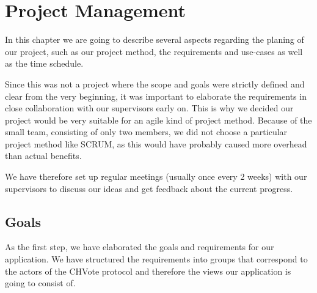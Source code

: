 
\newcommand{\zs}[0]{\cellcolor{zscol}}				%
\newcommand{\zi}[0]{\cellcolor{zicol}}				%
\newcommand{\ms}[1]{
	\makebox[.7cm][r]{
		\tikz[baseline=(char.base)]{
			\node[shape=circle,draw,inner sep=.02cm,fill=black,text=white] (char) { #1 };
		}
	}
}

\newcommand{\sq}[1]{\textcolor{#1}{\rule{.3cm}{.3cm}}}

\newcommand{\phase}[1]{
	\multicolumn{22}{l}{} \\
	\multicolumn{22}{l}{\cellcolor{gray!20}\textbf{#1}} \\ \hline
}

\chapter{Project Management}
In this chapter we are going to describe several aspects regarding the planing of our project, such as our project method, the requirements and use-cases as well as the time schedule.

Since this was not a project where the scope and goals were strictly defined and clear from the very beginning, it was important to elaborate the requirements in close collaboration with our supervisors early on. This is why we decided our project would be very suitable for an agile kind of project method. Because of the small team, consisting of only two members, we did not choose a particular project method like SCRUM, as this would have probably caused more overhead than actual benefits.

We have therefore set up regular meetings (usually once every 2 weeks) with our supervisors to discuss our ideas and get feedback about the current progress.

\section{Goals}
As the first step, we have elaborated the goals and requirements for our application. We have structured the requirements into groups that correspond to the actors of the CHVote protocol and therefore the views our application is going to consist of.

